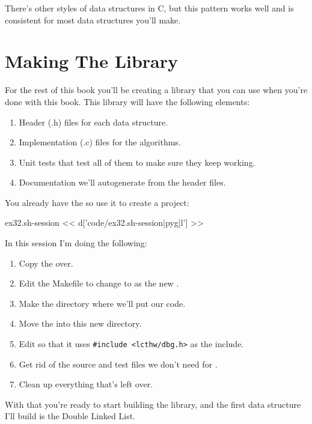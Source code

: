 There's other styles of data structures in C, but this pattern works well and is consistent for most data
structures you'll make.


\section{Making The Library}

For the rest of this book you'll be creating a library that you can use when you're done with this book.  This library will
have the following elements:

\begin{enumerate}
\item Header (.h) files for each data structure.
\item Implementation (.c) files for the algorithms.
\item Unit tests that test all of them to make sure they keep working.
\item Documentation we'll autogenerate from the header files.
\end{enumerate}

You already have the  so use it to create a  project:

\begin{code}{ex32.sh-session}
<< d['code/ex32.sh-session|pyg|l'] >>
\end{code}

In this session I'm doing the following:

\begin{enumerate}
\item Copy the  over.
\item Edit the Makefile to change  to 
    as the new .
\item Make the  directory where we'll put our code.
\item Move the  into this new directory.
\item Edit  so that it uses \verb|#include <lcthw/dbg.h>|
    as the include.
\item Get rid of the source and test files we don't need for .
\item Clean up everything that's left over.
\end{enumerate}

With that you're ready to start building the library, and the first data structure
I'll build is the Double Linked List.

